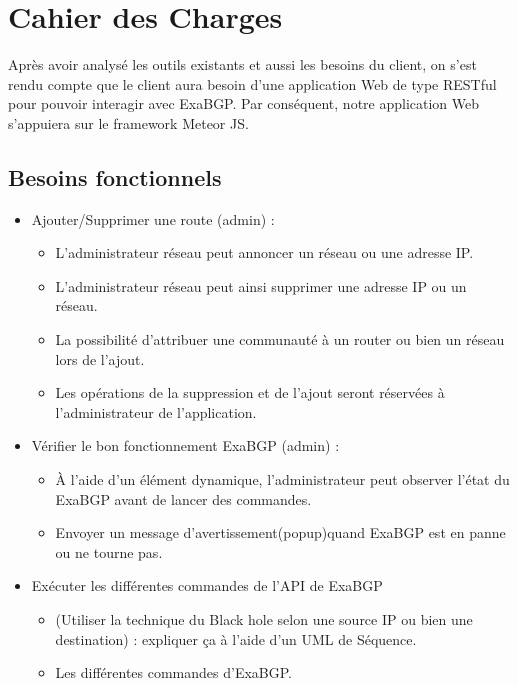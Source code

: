 \section{Cahier des Charges}
Après avoir analysé les outils existants et aussi les besoins du client, on s'est rendu compte que le client aura besoin d'une application Web de type RESTful pour pouvoir interagir avec ExaBGP.
\newline
Par conséquent, notre application Web s'appuiera sur le framework Meteor JS. 

\subsection{Besoins fonctionnels}

\begin{itemize}
\item Ajouter/Supprimer une route (admin) : 
	\begin{itemize}
		\item L'administrateur réseau peut annoncer un réseau ou une adresse IP.
        \item L'administrateur réseau peut ainsi supprimer une adresse IP ou un réseau.
        \item La possibilité d'attribuer une communauté à un router ou bien un réseau lors de l'ajout.
        \item Les opérations de la suppression et de l'ajout seront réservées à l'administrateur de l'application.
	\end{itemize}
    
\item Vérifier le bon fonctionnement ExaBGP (admin) :
	\begin{itemize}
		\item À l'aide d'un élément dynamique, l'administrateur peut observer l'état du ExaBGP avant de lancer des commandes.
        \item Envoyer un message d'avertissement(popup)quand ExaBGP est en panne ou ne tourne pas.
	\end{itemize}
    
\item Exécuter les différentes commandes de l'API de ExaBGP
	\begin{itemize}
		\item (Utiliser la technique du Black hole selon une source IP ou bien une destination) : expliquer ça à l'aide d'un UML de Séquence.
        \item Les différentes commandes d'ExaBGP.
	\end{itemize}	


\end{itemize}
